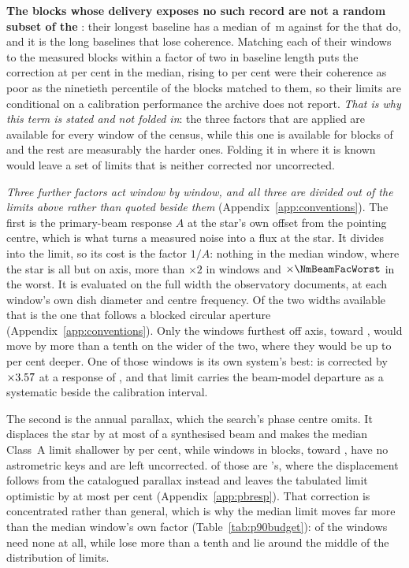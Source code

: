 \textbf{The \RpDecNUn{} blocks whose delivery exposes no such record are not
a random subset of the \SensDecorNBlkTot}: their longest baseline has a median
of \RpDecBlUn\,m against \RpDecBlMeas{} for the \SensDecorNBlk{} that do, and
it is the long baselines that lose coherence. Matching each of their windows
to the measured blocks within a factor of two in baseline length puts the
correction at \RpDecMatchMed{} per cent in the median, rising to
\RpDecMatchHi{} per cent were their coherence as poor as the ninetieth
percentile of the blocks matched to them, so their limits are conditional on
a calibration performance the archive does not report. \emph{That is why this
term is stated and not folded in}: the three factors that are applied are
available for every window of the census, while this one is available for
\SensDecorNBlk{} blocks of \SensDecorNBlkTot{} and the rest are measurably
the harder ones. Folding it in where it is known would leave a set of limits
that is neither corrected nor uncorrected.

\emph{Three further factors act window by window, and all three are divided
out of the limits above rather than quoted beside them}
(Appendix~\ref{app:conventions}). The first is the primary-beam response
$A$ at the star's own offset from the pointing centre, which is what turns a
measured noise into a flux at the star. It divides into the limit, so its
cost is the factor $1/A$: nothing in the median window, where the star is all
but on axis, more than $\times2$ in \NmBeamNFacTwo{} windows and
$\times\NmBeamFacWorst$ in the worst. It is evaluated on the full width the
observatory documents, at each window's own dish diameter and centre
frequency. Of the two widths available that is the one that follows a blocked
circular aperture (Appendix~\ref{app:conventions}). Only the
\BmNAboveTenPct{} windows furthest off axis, toward \BnStarList, would move
by more than a tenth on the wider of the two, where they would be up to
\BmShiftMaxPct{} per cent deeper. One of those windows is its own system's
best: \BnBestSys{} is corrected by $\times3.57$ at a response of
\BnBestResp, and that limit carries the beam-model departure as a
systematic beside the calibration interval.

The second is the annual parallax, which the search's phase centre omits. It
displaces the star by at most \SensBeamsMax{} of a synthesised beam and makes
the median Class~A limit shallower by \PxaShiftWinPct{} per cent, while
\PxaNMissing{} windows in \PxaNMissingEb{} blocks, toward
\PxaMissingStars, have no astrometric keys and are left uncorrected.
\PxaNMissingTop{} of those are \PxaMissingTopStar's, where the displacement
follows from the catalogued parallax instead and leaves the tabulated limit
optimistic by at most \BmEpsPxBoundPct{} per cent
(Appendix~\ref{app:pbresp}). That correction is concentrated rather than general, which is
why the median limit moves far more than the median window's own factor
(Table~\ref{tab:p90budget}): \RpPxNNone{} of the \NWinA{} windows need none
at all, while \RpPxNBig{} lose more than a tenth and lie around the middle of
the distribution of limits.

